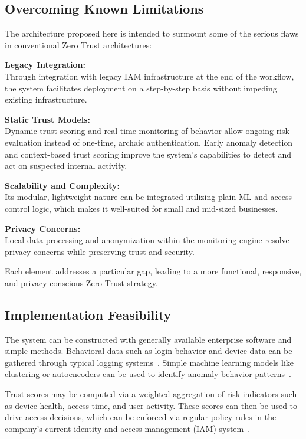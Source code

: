 \documentclass[conference]{IEEEtran}
\begin{document}
\subsection{Overcoming Known Limitations}
The architecture proposed here is intended to surmount some of the serious flaws in conventional Zero Trust architectures:

\textbf{Legacy Integration:} \\ 
Through integration with legacy IAM infrastructure at the end of the workflow, the system facilitates deployment on a step-by-step basis without impeding existing infrastructure.\cite{paper12}

\textbf{Static Trust Models:} \\ 
Dynamic trust scoring and real-time monitoring of behavior allow ongoing risk evaluation instead of one-time, archaic authentication.\cite{paper2,paper6,paper8,paper10}
Early anomaly detection and context-based trust scoring improve the system's capabilities to detect and act on suspected internal activity.\cite{paper2,paper8,paper11} 

\textbf{Scalability and Complexity:} \\ 
Its modular, lightweight nature can be integrated utilizing plain ML and access control logic, which makes it well-suited for small and mid-sized businesses.\cite{paper6,paper10,paper12}

\textbf{Privacy Concerns:} \\ 
Local data processing and anonymization within the monitoring engine resolve privacy concerns while preserving trust and security.\cite{paper2,paper8}

Each element addresses a particular gap, leading to a more functional, responsive, and privacy-conscious Zero Trust strategy.

\subsection{Implementation Feasibility}

The system can be constructed with generally available enterprise software and simple methods. Behavioral data such as login behavior and device data can be gathered through typical logging systems~\cite{paper2,paper6,paper8}. Simple machine learning models like clustering or autoencoders can be used to identify anomaly behavior patterns~\cite{paper2,paper6,paper8}.

Trust scores may be computed via a weighted aggregation of risk indicators such as device health, access time, and user activity. These scores can then be used to drive access decisions, which can be enforced via regular policy rules in the company's current identity and access management (IAM) system~\cite{paper2,paper8,paper12}.
\end{document}
